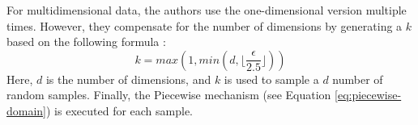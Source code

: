 
For multidimensional data, the authors use the one-dimensional version multiple times.
However, they compensate for the number of dimensions by generating a $k$ based on the following formula \citep{wang_collecting_2019}:
\begin{equation}
  k = max (1, min (d, \lfloor \frac{\epsilon}{2.5} \rfloor))
\end{equation}
Here, $d$ is the number of dimensions, and $k$ is used to sample a $d$ number of random samples.
Finally, the Piecewise mechanism (see Equation \ref{eq:piecewise-domain}) is executed for each sample.

